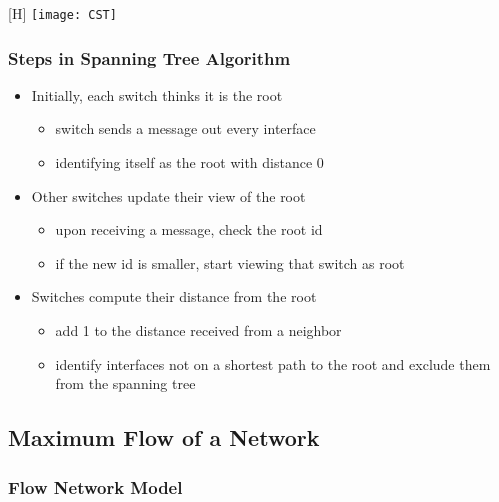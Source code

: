 \documentclass[../resumosRCOM.tex]{subfiles}
\begin{document}
\begin{center}[H]
    \texttt{[image: CST]}
\end{center}

\subsubsection{Steps in Spanning Tree Algorithm}

\begin{itemize}
    \item Initially, each switch thinks it is the root
    \begin{itemize}
        \item switch sends a message out every interface
        \item identifying itself as the root with distance 0
    \end{itemize}
    \item Other switches update their view of the root
    \begin{itemize}
        \item upon receiving a message, check the root id
        \item if the new id is smaller, start viewing that switch as root
    \end{itemize}
    \item Switches compute their distance from the root
    \begin{itemize}
        \item add 1 to the distance received from a neighbor
        \item identify interfaces not on a shortest path to the root and exclude them from the spanning tree
    \end{itemize}
\end{itemize}

\subsection{Maximum Flow of a Network}

\subsubsection{Flow Network Model}
\end{document}
